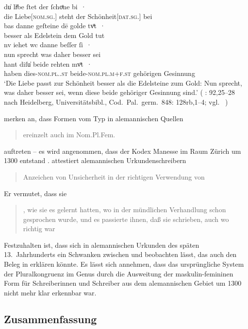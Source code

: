 \begin{exe}
\ex\label{ex:walther92_25-28_C_2}
	\gll du̍ liͤbe ſtet der ſchoͤne bi~· \\
			die Liebe[\textsc{nom.sg.\FemI}] steht der
			Schönheit[\textsc{dat.sg.\FemI}] bei \\
\sn \gll bas danne geſteine dē golde tvͦt~· \\
		besser als Edelstein dem Gold tut \\
\sn \gll nv iehet wc danne beſſer ſi~· \\
		nun sprecht was daher besser sei \\
\sn \gll hant diſu̍ beide rehten mvͦt~· \\
		haben dies-\textsc{nom.pl.\NeutI.st} beide-\textsc{nom.pl.m+f\subI.st}
			gehörigen Gesinnung \\
	\trans `Die Liebe passt zur Schönheit besser als die Edelsteine zum
		Gold: Nun sprecht, was daher besser sei, wenn diese beide gehöriger
		Gesinnung sind.'
		(%
			: 92,25--28 nach
			Heidelberg, Universitätsbibl., Cod.~Pal.~germ.~848: 128rb,1--4;
			vgl.~\cite[356--358]{bein2013}%
		)
	\\
\end{exe}

\citeauthor{ksw2} merken an, dass Formen vom Typ  in alemannischen
Quellen \blockcquote[485]{ksw2}{ereinzelt auch im Nom.Pl.Fem.}
auftreten -- es wird angenommen, dass der Kodex Manesse im Raum Zürich um 1300
entstand \autocite[4957]{hsc}.  attestiert alemannischen
Urkundenschreibern \blockcquote[27]{deboor1976b}{Anzeichen von Unsicherheit in
der richtigen Verwendung von }. Er vermutet, dass sie
\blockcquote[28]{deboor1976b}{ , wie sie es
gelernt hatten, wo in der mündlichen Verhandlung schon  gesprochen
wurde, und es passierte ihnen, daß sie  schrieben, auch wo
 richtig war}. Festzuhalten ist, dass sich in alemannischen Urkunden
des späten 13.~Jahrhunderts ein Schwanken zwischen  und 
beobachten lässt, das auch den Beleg in  erklären
könnte. Es lässt sich annehmen, dass das ursprüngliche System der
Pluralkongruenz im Genus durch die Ausweitung der maskulin-femininen Form für
Schreiberinnen und Schreiber aus dem alemannischen Gebiet um 1300 nicht mehr
klar erkennbar war.

\subsection{Zusammenfassung}


